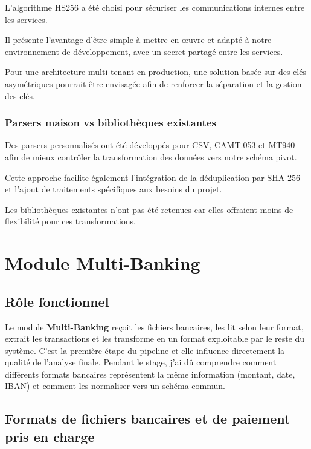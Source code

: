 \documentclass[12pt,a4paper]{extreport}
\begin{document}
L'algorithme HS256 a été choisi pour sécuriser les communications internes entre les services.

Il présente l'avantage d'être simple à mettre en œuvre et adapté à notre environnement de développement, avec un secret partagé entre les services.

Pour une architecture multi-tenant en production, une solution basée sur des clés asymétriques pourrait être envisagée afin de renforcer la séparation et la gestion des clés.

\subsection{Parsers maison vs bibliothèques existantes}

Des parsers personnalisés ont été développés pour CSV, CAMT.053 et MT940 afin de mieux contrôler la transformation des données vers notre schéma pivot.

Cette approche facilite également l'intégration de la déduplication par SHA-256 et l'ajout de traitements spécifiques aux besoins du projet.

Les bibliothèques existantes n'ont pas été retenues car elles offraient moins de flexibilité pour ces transformations.

\chapter{Module Multi-Banking}

\section{Rôle fonctionnel}

Le module \textbf{Multi-Banking} reçoit les fichiers bancaires, les lit selon leur format, extrait les transactions et les transforme en un format exploitable par le reste du système. C'est la première étape du pipeline et elle influence directement la qualité de l'analyse finale. Pendant le stage, j'ai dû comprendre comment différents formats bancaires représentent la même information (montant, date, IBAN) et comment les normaliser vers un schéma commun.

\section{Formats de fichiers bancaires et de paiement pris en charge}
\end{document}
